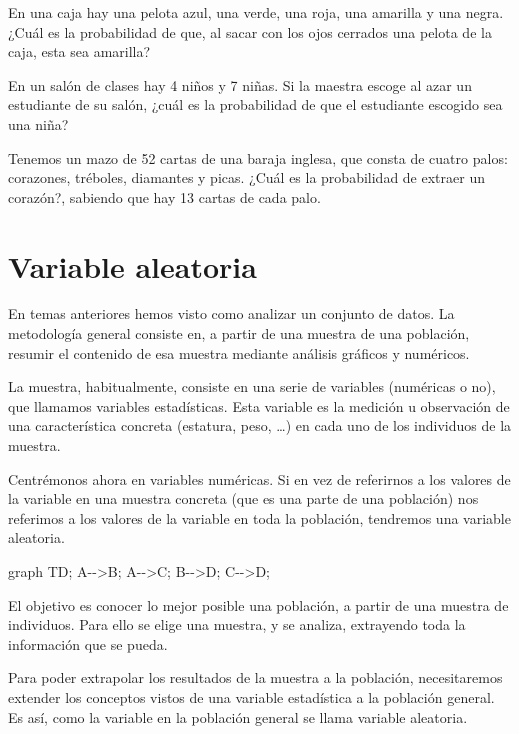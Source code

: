 \documentclass[
]{book}
\newenvironment{Shaded}{\begin{snugshade}}{\end{snugshade}}
\newcommand{\NormalTok}[1]{#1}
\begin{document}
En una caja hay una pelota azul, una verde, una roja, una amarilla y una negra. ¿Cuál es la probabilidad de que, al sacar con los ojos cerrados una pelota de la caja, esta sea amarilla?

En un salón de clases hay 4 niños y 7 niñas. Si la maestra escoge al azar un estudiante de su salón, ¿cuál es la probabilidad de que el estudiante escogido sea una niña?

Tenemos un mazo de 52 cartas de una baraja inglesa, que consta de cuatro palos: corazones, tréboles, diamantes y picas. ¿Cuál es la probabilidad de extraer un corazón?, sabiendo que hay 13 cartas de cada palo.

\hypertarget{variable-aleatoria}{%
\section{Variable aleatoria}\label{variable-aleatoria}}

En temas anteriores hemos visto como analizar un conjunto de datos. La metodología general consiste en, a partir de una muestra de una población, resumir el contenido de esa muestra mediante análisis gráficos y numéricos.

La muestra, habitualmente, consiste en una serie de variables (numéricas o no), que llamamos variables estadísticas. Esta variable es la medición u observación de una característica concreta (estatura, peso, \ldots) en cada uno de los individuos de la muestra.

Centrémonos ahora en variables numéricas. Si en vez de referirnos a los valores de la variable en una muestra concreta (que es una parte de una población) nos referimos a los valores de la variable en toda la población, tendremos una variable aleatoria.

\begin{Shaded}
\begin{Highlighting}[]
\NormalTok{  graph TD;}
\NormalTok{      A{-}{-}\textgreater{}B;}
\NormalTok{      A{-}{-}\textgreater{}C;}
\NormalTok{      B{-}{-}\textgreater{}D;}
\NormalTok{      C{-}{-}\textgreater{}D;}
\end{Highlighting}
\end{Shaded}

El objetivo es conocer lo mejor posible una población, a partir de una muestra de individuos. Para ello se elige una muestra, y se analiza, extrayendo toda la información que se pueda.

Para poder extrapolar los resultados de la muestra a la población, necesitaremos extender los conceptos vistos de una variable estadística a la población general. Es así, como la variable en la población general se llama variable aleatoria.
\end{document}
